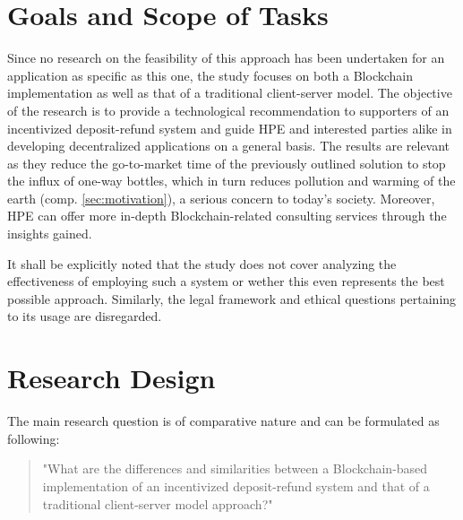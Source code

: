 
\section{Goals and Scope of Tasks}
Since no research on the feasibility of this approach has been undertaken for an application as specific as this one, the study focuses on both a Blockchain implementation as well as that of a traditional client-server model. The objective of the research is to provide a technological recommendation to supporters of an incentivized deposit-refund system and guide \ac{HPE} and interested parties alike in developing decentralized applications on a general basis. The results are relevant as they reduce the go-to-market time of the previously outlined solution to stop the influx of one-way bottles, which in turn reduces pollution and warming of the earth (comp. \ref{sec:motivation}), a serious concern to today's society. Moreover, \ac{HPE} can offer more in-depth Blockchain-related consulting services through the insights gained.

It shall be explicitly noted that the study does not cover analyzing the effectiveness of employing such a system or wether this even represents the best possible approach. Similarly, the legal framework and ethical questions pertaining to its usage are disregarded.



\section{Research Design}
The main research question is of comparative nature and can be formulated as following: 

\begin{quote}
	"What are the differences and similarities between a Blockchain-based implementation of an incentivized deposit-refund system and that of a traditional client-server model approach?"
\end{quote}

